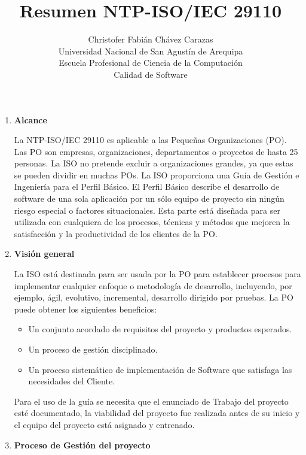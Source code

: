 \documentclass[a4paper,12pt]{article}
\begin{document}
\title{Resumen NTP-ISO/IEC 29110}
\author{
Christofer Fabián Chávez Carazas \\
\small{Universidad Nacional de San Agustín de Arequipa} \\
\small{Escuela Profesional de Ciencia de la Computación} \\
\small{Calidad de Software}
}
\date{}

\maketitle

\begin{enumerate}
 \item \textbf{Alcance}
 
 La NTP-ISO/IEC 29110 es aplicable a las Pequeñas Organizaciones (PO). Las PO son empresas, organizaciones, departamentos o proyectos de hasta 25 personas.
 La ISO no pretende excluir a organizaciones grandes, ya que estas se pueden dividir en muchas POs. La ISO proporciona una Guía de Gestión e Ingeniería para el Perfil Básico.
 El Perfil Básico describe el desarrollo de software de una sola aplicación por un sólo equipo de proyecto sin ningún riesgo especial o factores situacionales.
 Esta parte está diseñada para ser utilizada con cualquiera de los procesos, técnicas y métodos que mejoren la satisfacción y la productividad de los clientes de la PO.
 
 \item \textbf{Visión general}
 
 La ISO está destinada para ser usada por la PO para establecer procesos para implementar cualquier enfoque o metodología de desarrollo, incluyendo, por ejemplo, ágil, evolutivo,
 incremental, desarrollo dirigido por pruebas. La PO puede obtener los siguientes beneficios:
 \begin{itemize}
  \item Un conjunto acordado de requisitos del proyecto y productos esperados.
  \item Un proceso de gestión disciplinado.
  \item Un proceso sistemático de implementación de Software que satisfaga las necesidades del Cliente.
 \end{itemize}
 Para el uso de la guía se necesita que el enunciado de Trabajo del proyecto esté documentado, la viabilidad del proyecto fue realizada antes de su inicio y el equipo del proyecto está asignado
 y entrenado.
  
 \item \textbf{Proceso de Gestión del proyecto}
 

\end{enumerate}
\end{document}
